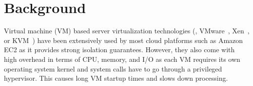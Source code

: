 \section{Background}
\label{sec:background}



Virtual machine (VM) based server virtualization technologies (\eg, VMware~\cite{xxx},
Xen~\cite{xxx}, or KVM~\cite{xxx}) have been extensively used by most cloud
platforms such as Amazon EC2 as it provides strong isolation guarantees.
%
%
However, they also come with high overhead in terms of CPU, memory, and I/O as
each VM requires its own operating system kernel and system calls have to go
through a privileged hypervisor. This causes long VM startup times and slows down
processing.
%
%

